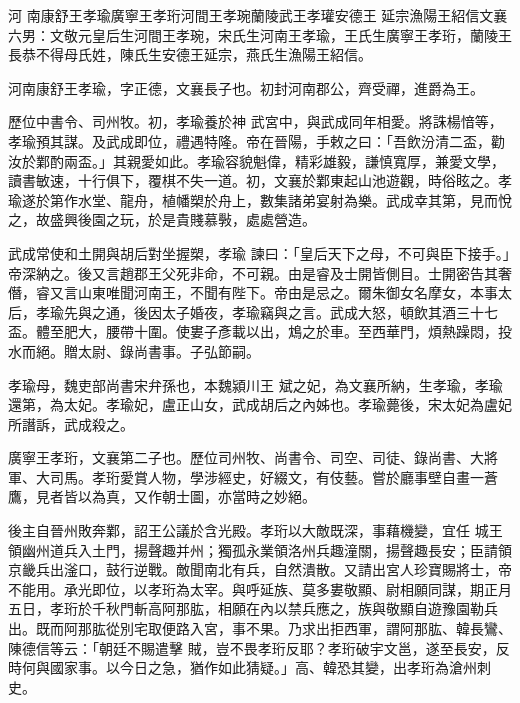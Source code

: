 
\begin{pinyinscope}

 河
 南康舒王孝瑜廣寧王孝珩河間王孝琬蘭陵武王孝瓘安德王
 延宗漁陽王紹信文襄六男：文敬元皇后生河間王孝琬，宋氏生河南王孝瑜，王氏生廣寧王孝珩，蘭陵王長恭不得母氏姓，陳氏生安德王延宗，燕氏生漁陽王紹信。



 河南康舒王孝瑜，字正德，文襄長子也。初封河南郡公，齊受禪，進爵為王。



 歷位中書令、司州牧。初，孝瑜養於神
 武宮中，與武成同年相愛。將誅楊愔等，孝瑜預其謀。及武成即位，禮遇特隆。帝在晉陽，手敕之曰：「吾飲汾清二盃，勸汝於鄴酌兩盃。」其親愛如此。孝瑜容貌魁偉，精彩雄毅，謙慎寬厚，兼愛文學，讀書敏速，十行俱下，覆棋不失一道。初，文襄於鄴東起山池遊觀，時俗眩之。孝瑜遂於第作水堂、龍舟，植幡槊於舟上，數集諸弟宴射為樂。武成幸其第，見而悅之，故盛興後園之玩，於是貴賤慕斅，處處營造。



 武成常使和土開與胡后對坐握槊，孝瑜
 諫曰：「皇后天下之母，不可與臣下接手。」帝深納之。後又言趙郡王父死非命，不可親。由是睿及士開皆側目。士開密告其奢僭，睿又言山東唯聞河南王，不聞有陛下。帝由是忌之。爾朱御女名摩女，本事太后，孝瑜先與之通，後因太子婚夜，孝瑜竊與之言。武成大怒，頓飲其酒三十七盃。體至肥大，腰帶十圍。使婁子彥載以出，鴆之於車。至西華門，煩熱躁悶，投水而絕。贈太尉、錄尚書事。子弘節嗣。



 孝瑜母，魏吏部尚書宋弁孫也，本魏潁川王
 斌之妃，為文襄所納，生孝瑜，孝瑜還第，為太妃。孝瑜妃，盧正山女，武成胡后之內姊也。孝瑜薨後，宋太妃為盧妃所譖訴，武成殺之。



 廣寧王孝珩，文襄第二子也。歷位司州牧、尚書令、司空、司徒、錄尚書、大將軍、大司馬。孝珩愛賞人物，學涉經史，好綴文，有伎藝。嘗於廳事壁自畫一蒼鷹，見者皆以為真，又作朝士圖，亦當時之妙絕。



 後主自晉州敗奔鄴，詔王公議於含光殿。孝珩以大敵既深，事藉機變，宜任
 城王領幽州道兵入土門，揚聲趣并州；獨孤永業領洛州兵趣潼關，揚聲趣長安；臣請領京畿兵出滏口，鼓行逆戰。敵聞南北有兵，自然潰散。又請出宮人珍寶賜將士，帝不能用。承光即位，以孝珩為太宰。與呼延族、莫多婁敬顯、尉相願同謀，期正月五日，孝珩於千秋門斬高阿那肱，相願在內以禁兵應之，族與敬顯自遊豫園勒兵出。既而阿那肱從別宅取便路入宮，事不果。乃求出拒西軍，謂阿那肱、韓長鸞、陳德信等云：「朝廷不賜遣擊
 賊，豈不畏孝珩反耶？孝珩破宇文邕，遂至長安，反時何與國家事。以今日之急，猶作如此猜疑。」高、韓恐其變，出孝珩為滄州刺史。




\end{pinyinscope}
